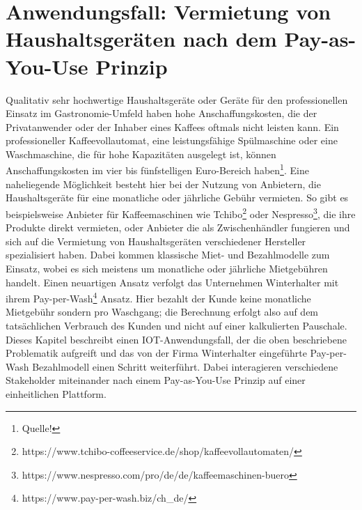 \chapter{Anwendungsfall: Vermietung von Haushaltsgeräten nach dem Pay-as-You-Use Prinzip}
\label{ch:iot_usecase}
Qualitativ sehr hochwertige Haushaltsgeräte oder Geräte für den professionellen Einsatz im Gastronomie-Umfeld haben hohe Anschaffungskosten, die der Privatanwender oder der Inhaber eines Kaffees oftmals nicht leisten kann. Ein professioneller Kaffeevollautomat, eine leistungsfähige Spülmaschine oder eine Waschmaschine, die für hohe Kapazitäten ausgelegt ist, können Anschaffungskosten im vier bis fünfstelligen Euro-Bereich haben\footnote{Quelle!}. Eine naheliegende Möglichkeit besteht hier bei der Nutzung von Anbietern, die Haushaltsgeräte für eine monatliche oder jährliche Gebühr vermieten. So gibt es beispielsweise Anbieter für Kaffeemaschinen wie Tchibo\footnote{https://www.tchibo-coffeeservice.de/shop/kaffeevollautomaten/} oder Nespresso\footnote{https://www.nespresso.com/pro/de/de/kaffeemaschinen-buero}, die ihre Produkte direkt vermieten, oder Anbieter die als Zwischenhändler fungieren und sich auf die Vermietung von Haushaltsgeräten verschiedener Hersteller spezialisiert haben. Dabei kommen klassische Miet- und Bezahlmodelle zum Einsatz, wobei es sich meistens um monatliche oder jährliche Mietgebühren handelt. Einen neuartigen Ansatz verfolgt das Unternehmen Winterhalter mit ihrem Pay-per-Wash\footnote{https://www.pay-per-wash.biz/ch\_de/} Ansatz. Hier bezahlt der Kunde keine monatliche Mietgebühr sondern pro Waschgang; die Berechnung erfolgt also auf dem tatsächlichen Verbrauch des Kunden und nicht auf einer kalkulierten Pauschale.\\
Dieses Kapitel beschreibt einen IOT-Anwendungsfall, der die oben beschriebene Problematik aufgreift und das von der Firma Winterhalter eingeführte Pay-per-Wash Bezahlmodell einen Schritt weiterführt. Dabei interagieren verschiedene Stakeholder miteinander nach einem Pay-as-You-Use Prinzip auf einer einheitlichen Plattform.
%
%
